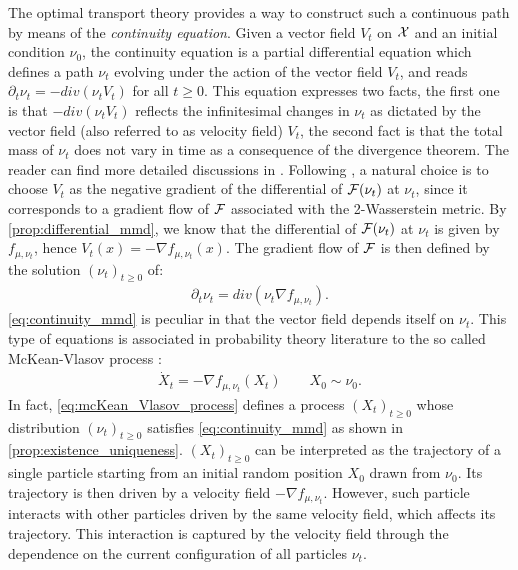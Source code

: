 The optimal transport theory provides a way to construct such a continuous path by means of the \textit{continuity equation}. Given a vector field $V_t$ on ${{\mathcal X}}$ and an initial condition $\nu_0$, the continuity equation is a partial differential equation which defines a path $\nu_t$ evolving under the action of the vector field $V_t$, and reads $\partial_t \nu_t = -div(\nu_t V_t)$ for all $t\geq0$.
This equation expresses two facts, the first one is that $-div(\nu_t V_t)$ reflects the infinitesimal changes in $\nu_t$ as dictated by the vector field (also referred to as velocity field) $V_t$, the second fact is that the total mass of $\nu_t$ does not vary in time as a consequence of the divergence theorem. The reader can find more detailed discussions in \cite{Santambrogio:2015}. Following  \cite{ambrosio2008gradient}, a natural choice is to choose $V_t$ as the negative gradient of the differential of ${{\mathcal F}}(\nu_t)$ at $\nu_t$, since it corresponds to a gradient flow of ${{\mathcal F}}$ associated with the 2-Wasserstein metric. %
By \cref{prop:differential_mmd}, we know that the differential of ${{\mathcal F}}(\nu_t)$  at $\nu_t$ is given by $f_{\mu,\nu_t}$, hence $V_t(x) = -\nabla f_{\mu,\nu_t}(x)$. The
gradient flow of ${{\mathcal F}}$ is then defined by the solution $(\nu_t)_{t\geq 0}$ of:
\begin{align}\label{eq:continuity_mmd}
	\partial_t \nu_t = div(\nu_t \nabla f_{\mu,\nu_t}).
\end{align}
\cref{eq:continuity_mmd} is peculiar in that the vector field depends itself on $\nu_t$. This type of equations is associated in probability theory literature to the so called McKean-Vlasov process \cite{nac1956foundations,mckean1966class}:
\begin{align}\label{eq:mcKean_Vlasov_process}
	\dot{X}_t = -\nabla f_{\mu,\nu_t}(X_t) \qquad X_0\sim \nu_0.
\end{align}
In fact,  \cref{eq:mcKean_Vlasov_process} defines a process $(X_t)_{t\geq 0}$ whose distribution $(\nu_t)_{t\geq 0}$ satisfies \cref{eq:continuity_mmd} as shown in \cref{prop:existence_uniqueness}. 
$(X_t)_{t\geq 0}$ can be interpreted as  the trajectory of a single particle starting from an initial random position $X_0$ drawn from $\nu_0$. Its trajectory is then driven by a velocity field $-\nabla f_{\mu,\nu_t}$. However, such particle interacts with other particles driven by the same velocity field, which affects its trajectory. This interaction is captured by the velocity field through the dependence on the current configuration of all particles $\nu_t$.
